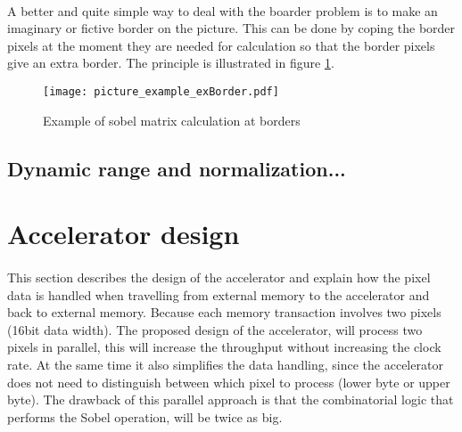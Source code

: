 \paragraph*{}
A better and quite simple way to deal with the boarder problem is to make an imaginary or fictive border on the picture. This  can be done by coping the border pixels at the moment they are needed for calculation so that the border pixels give an extra border. The principle is illustrated in figure \ref{fig:pic_matrix_exBorder}.

\begin{figure}[H]
	\centering
	\texttt{[image: picture\_example\_exBorder.pdf]}
	\caption{Example of sobel matrix calculation at borders}
	\label{fig:pic_matrix_exBorder}
\end{figure}  

\subsection{Dynamic range and normalization...}
\paragraph*{}

\section{Accelerator design} 
\label{sec:AccDesign}
\paragraph*{}
This section describes the design of the accelerator and explain how the pixel data is handled when travelling from external memory to the accelerator and back to external memory. 
Because each memory transaction involves two pixels (16bit data width). The proposed design of the accelerator, will process two pixels in parallel, this will increase the throughput without increasing the clock rate. At the same time it also simplifies the data handling, since the accelerator does not need to distinguish between which pixel to process (lower byte or upper byte). The drawback of this parallel approach is that the combinatorial logic that performs the Sobel operation, will be twice as big.

